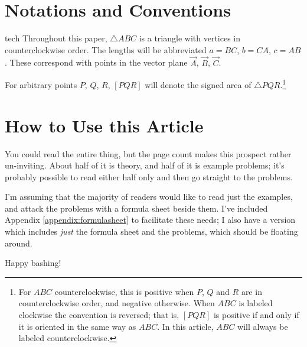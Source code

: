 \section{Notations and Conventions}
\begin{StoreCode}{tech}
Throughout this paper, $\triangle ABC$ is a triangle with vertices in counterclockwise order.   The lengths will be abbreviated $a=BC$, $b=CA$, $c=AB$.  These correspond with points in the vector plane $\vec A$, $\vec B$, $\vec C$.

For arbitrary points $P$, $Q$, $R$, $[PQR]$ will denote the signed area of $\triangle PQR$.\footnote{For $ABC$ counterclockwise, this is positive when $P$, $Q$ and $R$ are in counterclockwise order, and negative otherwise.  When $ABC$ is labeled clockwise the convention is reversed; that is, $[PQR]$ is positive if and only if it is oriented in the same way as $ABC$.  In this article, $ABC$ will always be labeled counterclockwise.}
\end{StoreCode}


\section{How to Use this Article}
You could read the entire thing, but the page count makes this prospect rather un-inviting.  About half of it is theory, and half of it is example problems; it's probably possible to read either half only and then go straight to the problems.

I'm assuming that the majority of readers would like to read just the examples, and attack the problems with a formula sheet beside them.  I've included Appendix \ref{appendix:formulasheet} to facilitate these needs; I also have a version which includes \textit{just} the formula sheet and the problems, which should be floating around.

Happy bashing!
